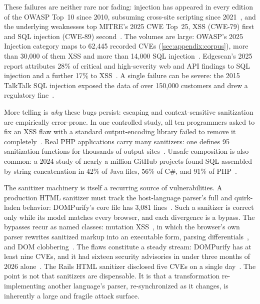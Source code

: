 These failures are neither rare nor fading: injection has appeared in every
edition of the OWASP Top~10 since 2010, subsuming cross-site scripting since
2021~\cite{owasp_top10_2021}, and the underlying weaknesses top MITRE's 2025
CWE Top~25, XSS (CWE-79) first and SQL injection (CWE-89)
second~\cite{cwe_top25_2025}. The volumes are large: OWASP's 2025 Injection
category maps to 62,445 recorded CVEs
(\cref{sec:appendix:corpus}), more than 30,000 of them XSS and more
than 14,000 SQL injection~\cite{owasp_top10_2025}. Edgescan's 2025 report
attributes 28\% of critical and high-severity web and API findings to SQL
injection and a further 17\% to XSS~\cite{edgescan25}. A single failure can be
severe: the 2015 TalkTalk SQL injection exposed the data of over 150,000
customers and drew a regulatory fine~\cite{ico_talktalk}.

More telling is \emph{why} these bugs persist: escaping and context-sensitive
sanitization are empirically error-prone. In one controlled study, all ten
programmers asked to fix an XSS flaw with a standard output-encoding library
failed to remove it completely~\cite{wijayarathna18esapi}. Real PHP
applications carry many sanitizers: one defines 95 sanitization functions for
thousands of output sites~\cite{weinberger11xss}. Unsafe composition is also
common: a 2024 study of nearly a million GitHub projects
found SQL assembled by string concatenation in 42\% of Java files, 56\% of
C\#, and 91\% of PHP~\cite{dennis24sql}.

\label{sec:bg:sanitizer}%
The sanitizer machinery is itself a recurring source of vulnerabilities.
A production HTML sanitizer must track the host-language parser's full and
quirk-laden behavior: DOMPurify's core file has 3,081 lines~\cite{dompurify_src}.
Such a sanitizer is correct only while its model matches every browser, and
each divergence is a bypass. The bypasses recur as named classes: mutation
XSS~\cite{heiderich13mxss,heyes20mxss}, in which the browser's own parser
rewrites sanitized markup into an executable form, parsing differentials~\cite{klein24parsing}, and DOM
clobbering~\cite{khodayari23clobbering}.
The flaws constitute a steady stream:
DOMPurify has at least nine CVEs, and it had
sixteen security advisories in under three months of 2026
alone~\cite{dompurify_advisories}. The Rails HTML sanitizer disclosed five
CVEs on a single day~\cite{rails_sanitizer_cves}.
The point is not that sanitizers are dispensable. It is that a transformation
re-implementing another language's parser, re-synchronized as it changes, is
inherently a large and fragile attack surface.

